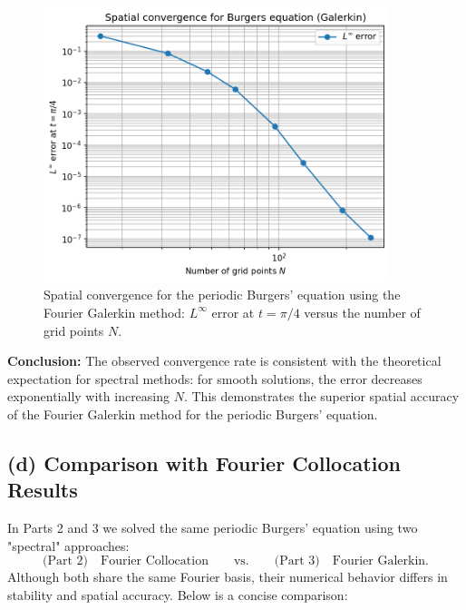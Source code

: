 \documentclass{article}
\begin{document}
\begin{figure}[htbp]
    \centering
    \includegraphics[width=0.9\textwidth]{figure/burgers_galerkin_N_convergence.png}
    \caption{Spatial convergence for the periodic Burgers' equation using the Fourier Galerkin method: $L^\infty$ error at $t=\pi/4$ versus the number of grid points $N$.}
    \label{fig:burgers_galerkin_N_convergence}
\end{figure}

\textbf{Conclusion:} The observed convergence rate is consistent with the theoretical expectation for spectral methods: for smooth solutions, the error decreases exponentially with increasing $N$. This demonstrates the superior spatial accuracy of the Fourier Galerkin method for the periodic Burgers' equation.

\subsection*{(d) Comparison with Fourier Collocation Results}

In Parts 2 and 3 we solved the same periodic Burgers' equation using two "spectral" approaches:
\[
  \text{(Part 2)}\quad\text{Fourier Collocation}
  \qquad\text{vs.}\qquad
  \text{(Part 3)}\quad\text{Fourier Galerkin}.
\]
Although both share the same Fourier basis, their numerical behavior differs in stability and spatial accuracy.  Below is a concise comparison:

\bigskip
\end{document}
